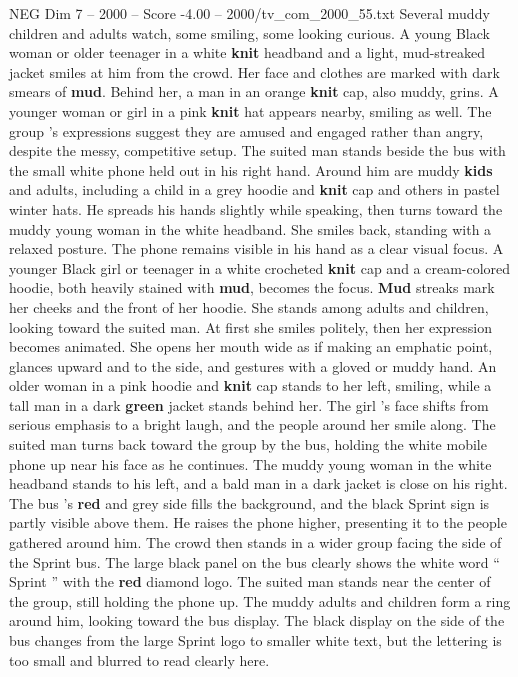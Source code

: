 \begin{textsample}{NEG Dim 7 – 2000 – Score -4.00 – 2000/tv\_com\_2000\_55.txt}
Several muddy children and adults watch, some smiling, some looking curious.
A young Black woman or older teenager in a white \textbf{knit} headband and a light, mud-streaked jacket smiles at him from the crowd.
Her face and clothes are marked with dark smears of \textbf{mud}.
Behind her, a man in an orange \textbf{knit} cap, also muddy, grins.
A younger woman or girl in a pink \textbf{knit} hat appears nearby, smiling as well.
The group ’s expressions suggest they are amused and engaged rather than angry, despite the messy, competitive setup.
The suited man stands beside the bus with the small white phone held out in his right hand.
Around him are muddy \textbf{kids} and adults, including a child in a grey hoodie and \textbf{knit} cap and others in pastel winter hats.
He spreads his hands slightly while speaking, then turns toward the muddy young woman in the white headband.
She smiles back, standing with a relaxed posture.
The phone remains visible in his hand as a clear visual focus.
A younger Black girl or teenager in a white crocheted \textbf{knit} cap and a cream-colored hoodie, both heavily stained with \textbf{mud}, becomes the focus. \textbf{Mud} streaks mark her cheeks and the front of her hoodie.
She stands among adults and children, looking toward the suited man.
At first she smiles politely, then her expression becomes animated.
She opens her mouth wide as if making an emphatic point, glances upward and to the side, and gestures with a gloved or muddy hand.
An older woman in a pink hoodie and \textbf{knit} cap stands to her left, smiling, while a tall man in a dark \textbf{green} jacket stands behind her.
The girl ’s face shifts from serious emphasis to a bright laugh, and the people around her smile along.
The suited man turns back toward the group by the bus, holding the white mobile phone up near his face as he continues.
The muddy young woman in the white headband stands to his left, and a bald man in a dark jacket is close on his right.
The bus ’s \textbf{red} and grey side fills the background, and the black Sprint sign is partly visible above them.
He raises the phone higher, presenting it to the people gathered around him.
The crowd then stands in a wider group facing the side of the Sprint bus.
The large black panel on the bus clearly shows the white word “ Sprint ” with the \textbf{red} diamond logo.
The suited man stands near the center of the group, still holding the phone up.
The muddy adults and children form a ring around him, looking toward the bus display.
The black display on the side of the bus changes from the large Sprint logo to smaller white text, but the lettering is too small and blurred to read clearly here.

\end{textsample}
